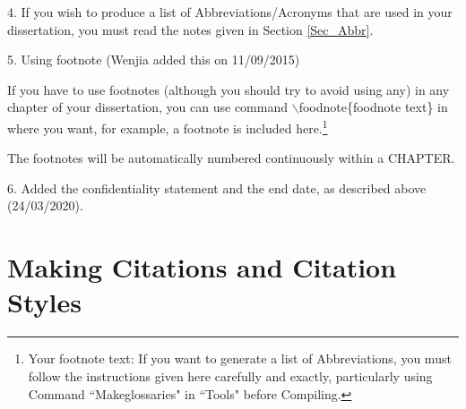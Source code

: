 4. If you wish to produce a list of Abbreviations/Acronyms 
 that are used in your dissertation, you must read the notes given in Section \ref{Sec_Abbr}. 
%
% 
%
% 
%
% 
%
% 


5. Using footnote (Wenjia added this on 11/09/2015)
 
 If you have to use footnotes (although you should try to avoid using any) in any chapter of your dissertation, 
you can use command $\backslash$foodnote\{foodnote text\} in where you want, for example, a footnote is included here.\footnote{Your footnote text: If you want to generate a list of Abbreviations, you must follow the instructions given here carefully and exactly, particularly using Command ``Makeglossaries" in ``Tools" before Compiling.} 
	
The footnotes will be automatically numbered continuously within a CHAPTER. 

6. Added the confidentiality statement and the end date, as described above (24/03/2020).  


\section {Making Citations and Citation Styles}


